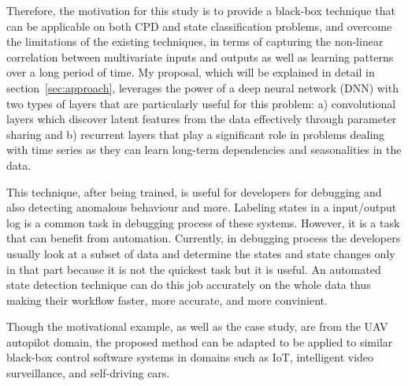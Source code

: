 Therefore, the motivation for this study is to provide a black-box technique that can be applicable on both CPD and state classification problems, and overcome the limitations of the existing techniques, in terms of capturing the non-linear correlation between multivariate inputs and outputs as well as learning patterns over a long period of time. My proposal, which will be explained in detail in section~\ref{sec:approach}, leverages the power of a deep neural network (DNN) with two types of layers that are particularly useful for this problem: a) convolutional layers which discover latent features from the data effectively through parameter sharing and b) recurrent layers that play a significant role in problems dealing with time series as they can learn long-term dependencies and seasonalities in the data. 

This technique, after being trained, is useful for developers for debugging and also detecting anomalous behaviour and more. Labeling states in a input/output log is a common task in debugging process of these systems. However, it is a task that can benefit from automation. Currently, in debugging process the developers usually look at a subset of data and determine the states and state changes only in that part because it is not the quickest task but it is useful. An automated state detection technique can do this job accurately on the whole data thus making their workflow faster, more accurate, and more convinient.

Though the motivational example, as well as the case study, are from the UAV autopilot domain, the proposed method can be adapted to be applied to similar black-box control software systems in domains such as IoT, intelligent video surveillance, and self-driving cars.